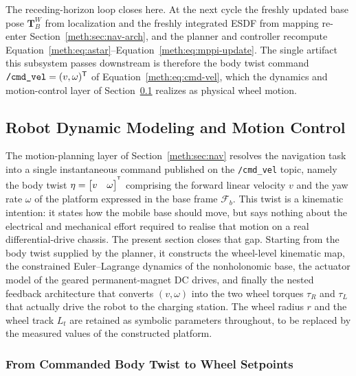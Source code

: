 The receding-horizon loop closes here. At the next cycle the freshly updated base pose
$\mathbf{T}^{W}_{B}$ from localization and the freshly integrated ESDF from mapping re-enter
Section~\ref{meth:sec:nav-arch}, and the planner and controller recompute Equation~\eqref{meth:eq:astar}--Equation~\eqref{meth:eq:mppi-update}.
The single artifact this subsystem passes downstream is therefore the body twist command
$\texttt{/cmd\_vel}=(v,\omega)^{\mathsf{T}}$ of Equation~\eqref{meth:eq:cmd-vel}, which the dynamics and motion-control
layer of Section~\ref{meth:sec:dyn} realizes as physical wheel motion.


\subsection{Robot Dynamic Modeling and Motion Control}\label{meth:sec:dyn}

The motion-planning layer of Section~\ref{meth:sec:nav} resolves the navigation task into a single instantaneous command published on the \texttt{/cmd\_vel} topic, namely the body twist $\eta=\begin{bmatrix}v & \omega\end{bmatrix}^{^{\mathsf{T}}}$ comprising the forward linear velocity $v$ and the yaw rate $\omega$ of the platform expressed in the base frame $\mathcal{F}_b$. This twist is a kinematic intention: it states how the mobile base should move, but says nothing about the electrical and mechanical effort required to realise that motion on a real differential-drive chassis. The present section closes that gap. Starting from the body twist supplied by the planner, it constructs the wheel-level kinematic map, the constrained Euler--Lagrange dynamics of the nonholonomic base, the actuator model of the geared permanent-magnet DC drives, and finally the nested feedback architecture that converts $(v,\omega)$ into the two wheel torques $\tau_R$ and $\tau_L$ that actually drive the robot to the charging station. The wheel radius $r$ and the wheel track $L_t$ are retained as symbolic parameters throughout, to be replaced by the measured values of the constructed platform.

\subsubsection{From Commanded Body Twist to Wheel Setpoints}\label{meth:subsec:ik}

